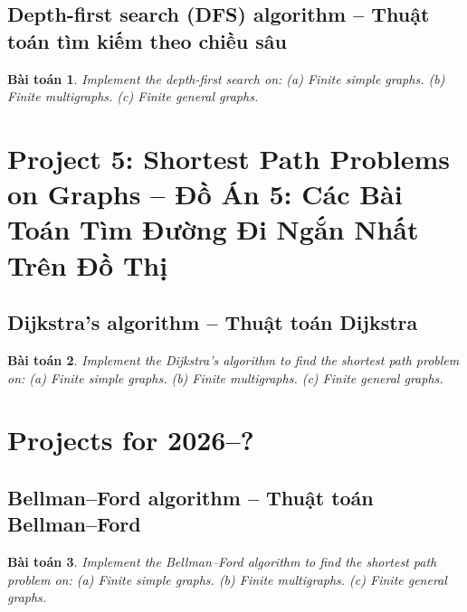 \documentclass{article}
\newtheorem{baitoan}{Bài toán}
\begin{document}

\subsection{Depth-first search (DFS) algorithm -- Thuật toán tìm kiếm theo chiều sâu}

\begin{baitoan}
    Implement the depth-first search on: (a) Finite simple graphs. (b) Finite multigraphs. (c) Finite general graphs.
\end{baitoan}


\section{Project 5: Shortest Path Problems on Graphs -- Đồ Án 5: Các Bài Toán Tìm Đường Đi Ngắn Nhất Trên Đồ Thị}


\subsection{Dijkstra's algorithm -- Thuật toán Dijkstra}

\begin{baitoan}
    Implement the Dijkstra's algorithm to find the shortest path problem on: (a) Finite simple graphs. (b) Finite multigraphs. (c) Finite general graphs.
\end{baitoan}


\section{Projects for 2026--?}


\subsection{Bellman--Ford algorithm -- Thuật toán Bellman--Ford}

\begin{baitoan}
    Implement the Bellman--Ford algorithm to find the shortest path problem on: (a) Finite simple graphs. (b) Finite multigraphs. (c) Finite general graphs.
\end{baitoan}
\end{document}

